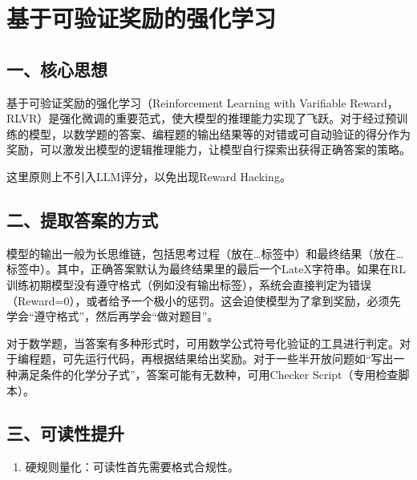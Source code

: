 \clearpage

\hypertarget{ux57faux4e8eux53efux9a8cux8bc1ux5956ux52b1ux7684ux5f3aux5316ux5b66ux4e60}{%
\section{基于可验证奖励的强化学习}\label{ux57faux4e8eux53efux9a8cux8bc1ux5956ux52b1ux7684ux5f3aux5316ux5b66ux4e60}}

\hypertarget{ux4e00ux6838ux5fc3ux601dux60f3-6}{%
\subsection{一、核心思想}\label{ux4e00ux6838ux5fc3ux601dux60f3-6}}

基于可验证奖励的强化学习（Reinforcement Learning with Varifiable Reward，RLVR）是强化微调的重要范式，使大模型的推理能力实现了飞跃。对于经过预训练的模型，以数学题的答案、编程题的输出结果等的对错或可自动验证的得分作为奖励，可以激发出模型的逻辑推理能力，让模型自行探索出获得正确答案的策略。

这里原则上不引入LLM评分，以免出现Reward Hacking。

\hypertarget{ux4e8cux63d0ux53d6ux7b54ux6848ux7684ux65b9ux5f0f}{%
\subsection{二、提取答案的方式}\label{ux4e8cux63d0ux53d6ux7b54ux6848ux7684ux65b9ux5f0f}}

模型的输出一般为长思维链，包括思考过程（放在\ldots{}标签中）和最终结果（放在\ldots{}标签中）。其中，正确答案默认为最终结果里的最后一个LateX字符串。如果在RL训练初期模型没有遵守格式（例如没有输出标签），系统会直接判定为错误（Reward=0），或者给予一个极小的惩罚。这会迫使模型为了拿到奖励，必须先学会``遵守格式''，然后再学会``做对题目''。

对于数学题，当答案有多种形式时，可用数学公式符号化验证的工具进行判定。对于编程题，可先运行代码，再根据结果给出奖励。对于一些半开放问题如``写出一种满足条件的化学分子式''，答案可能有无数种，可用Checker Script（专用检查脚本）。

\hypertarget{ux4e09ux53efux8bfbux6027ux63d0ux5347}{%
\subsection{三、可读性提升}\label{ux4e09ux53efux8bfbux6027ux63d0ux5347}}

\begin{enumerate}
\def\labelenumi{\arabic{enumi}.}
\tightlist
\item
  硬规则量化：可读性首先需要格式合规性。
\end{enumerate}

